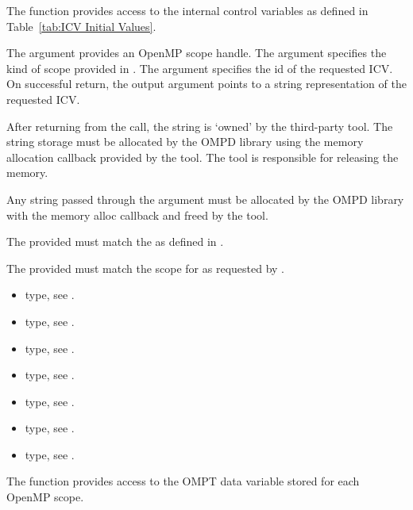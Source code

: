 \begin{itemize}
\descr
The function  provides access to the internal 
control variables as defined in Table~\ref{tab:ICV Initial Values}.

\argdesc

The argument  provides an OpenMP scope handle.
The argument  specifies the kind of scope provided in .
The argument  specifies the id of the requested ICV.
On successful return, the output argument  points to a string 
representation of the requested ICV.

After returning from the call, the string  is `owned' by the third-party 
tool.
The string storage must be allocated by the OMPD library using the memory allocation 
callback provided by the tool.
The tool is responsible for releasing the memory.


\constraints
Any string passed through the argument  must be allocated by the OMPD 
library with the memory alloc callback  and freed 
by the tool.

The provided  must match the  as defined in 
. 

The provided  must match the scope for  as requested by 
. 


\crossreferences
\begin{itemize}
	\item {} type, see 
	.
	\item {} type, see .
	\item {} type, see 
	.
	\item {} type, see .
	\item {} type, see .
	\item {} type, see .
	\item {} type, see .
\end{itemize}

\label{subsubsubsec:ompd_get_tool_data}
\summary
The  function provides access to the OMPT data variable 
stored for each OpenMP scope.


\end{itemize}
